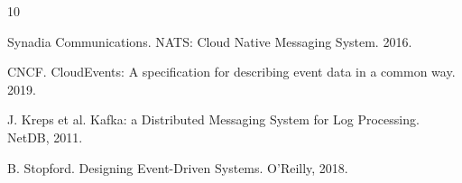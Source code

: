 \documentclass[11pt,twocolumn]{article}
\begin{document}

\begin{thebibliography}{10}

Synadia Communications. NATS: Cloud Native Messaging System. 2016.

CNCF. CloudEvents: A specification for describing event data in a common way. 2019.

J. Kreps et al. Kafka: a Distributed Messaging System for Log Processing. NetDB, 2011.

B. Stopford. Designing Event-Driven Systems. O'Reilly, 2018.

\end{thebibliography}
\end{document}
